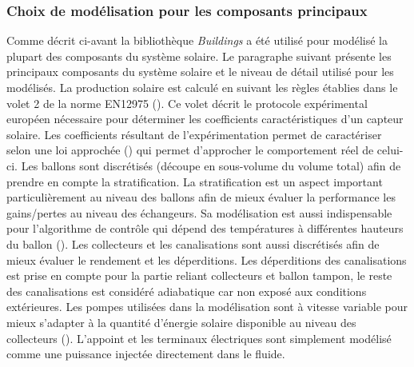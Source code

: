 


\subsubsection{Choix de modélisation pour les composants principaux} %
\label{ssub:choix_de_modelisation_pour_les_composants_principaux}
Comme décrit ci-avant la bibliothèque \emph{Buildings} a été utilisé pour modélisé
la plupart des composants du système solaire. Le paragraphe suivant présente les principaux
composants du système solaire et le niveau de détail utilisé pour les modélisés.
La production solaire est calculé en suivant les règles établies dans le volet 2 de
la norme EN12975 (). Ce volet décrit le protocole expérimental
européen nécessaire pour déterminer les coefficients caractéristiques d’un capteur solaire.
Les coefficients résultant de l’expérimentation permet de caractériser selon une loi
approchée () qui permet d’approcher le comportement réel de celui-ci.
Les ballons sont discrétisés (découpe en sous-volume du volume total)
afin de prendre en compte la stratification. La stratification est un aspect important
particulièrement au niveau des ballons afin de mieux évaluer la performance les
gains/pertes au niveau des échangeurs. Sa modélisation est aussi indispensable
pour l’algorithme de contrôle qui dépend des températures à différentes
hauteurs du ballon ().
Les collecteurs et les canalisations sont aussi discrétisés afin de mieux évaluer
le rendement et les déperditions.
Les déperditions des canalisations est prise en compte pour la partie reliant
collecteurs et ballon tampon, le reste des canalisations est considéré adiabatique
car non exposé aux conditions extérieures.
Les pompes utilisées dans la modélisation sont à vitesse variable pour mieux s’adapter
à la quantité d’énergie solaire disponible au niveau des collecteurs ().
L’appoint et les terminaux électriques sont simplement modélisé comme une puissance
injectée directement dans le fluide.



